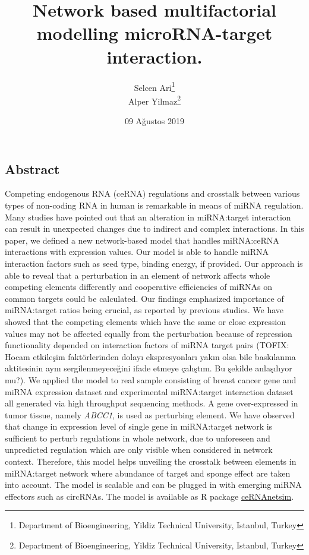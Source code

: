 \documentclass[]{article}
\title{Network based multifactorial modelling microRNA-target interaction.}
\author{Selcen Ari\footnote{Department of Bioengineering, Yildiz Technical
  University, Istanbul, Turkey} \\ Alper Yilmaz\footnote{Department of Bioengineering, Yildiz Technical
  University, Istanbul, Turkey}}
\date{09 Ağustos 2019}
\begin{document}
\maketitle

\hypertarget{abstract}{%
\subsection{Abstract}\label{abstract}}

Competing endogenous RNA (ceRNA) regulations and crosstalk between
various types of non-coding RNA in human is remarkable in means of miRNA
regulation. Many studies have pointed out that an alteration in
miRNA:target interaction can result in unexpected changes due to
indirect and complex interactions. In this paper, we defined a new
network-based model that handles miRNA:ceRNA interactions with
expression values. Our model is able to handle miRNA interaction factors
such as seed type, binding energy, if provided. Our approach is able to
reveal that a perturbation in an element of network affects whole
competing elements differently and cooperative efficiencies of miRNAs on
common targets could be calculated. Our findings emphasized importance
of miRNA:target ratios being crucial, as reported by previous studies.
We have showed that the competing elements which have the same or close
expression values may not be affected equally from the perturbation
because of repression functionality depended on interaction factors of
miRNA target pairs (TOFIX: Hocam etkileşim faktörlerinden dolayı
ekspresyonları yakın olsa bile baskılanma aktitesinin aynı
sergilenmeyeceğini ifade etmeye çalıştım. Bu şekilde anlaşılıyor mu?).
We applied the model to real sample consisting of breast cancer gene and
miRNA expression dataset and experimental miRNA:target interaction
dataset all generated via high throughput sequencing methods. A gene
over-expressed in tumor tissue, namely \emph{ABCC1}, is used as
perturbing element. We have observed that change in expression level of
single gene in miRNA:target network is sufficient to perturb regulations
in whole network, due to unforeseen and unpredicted regulation which are
only visible when considered in network context. Therefore, this model
helps unveiling the crosstalk between elements in miRNA:target network
where abundance of target and sponge effect are taken into account. The
model is scalable and can be plugged in with emerging miRNA effectors
such as circRNAs. The model is available as R package
\href{https://github.com/selcenari/ceRNAnetsim}{ceRNAnetsim}.
\end{document}
